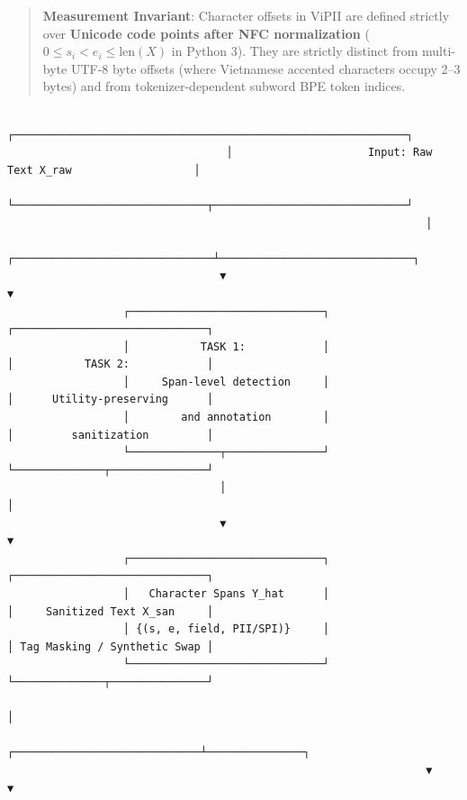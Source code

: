 \documentclass[
]{article}
\begin{document}
\begin{quote}
\textbf{Measurement Invariant}: Character offsets in ViPII are defined
strictly over \textbf{Unicode code points after NFC normalization}
(\(0 \le s_i < e_i \le \text{len}(X)\) in Python 3). They are strictly
distinct from multi-byte UTF-8 byte offsets (where Vietnamese accented
characters occupy 2--3 bytes) and from tokenizer-dependent subword BPE
token indices.
\end{quote}

\begin{verbatim}
                                  ┌─────────────────────────────────────────────────────────────┐
                                  │                     Input: Raw Text X_raw                   │
                                  └──────────────────────────────┬──────────────────────────────┘
                                                                 │
                                 ┌───────────────────────────────┴──────────────────────────────┐
                                 ▼                                                              ▼
                  ┌──────────────────────────────┐                              ┌──────────────────────────────┐
                  │           TASK 1:            │                              │           TASK 2:            │
                  │     Span-level detection     │                              │      Utility-preserving      │
                  │        and annotation        │                              │         sanitization         │
                  └──────────────┬───────────────┘                              └──────────────┬───────────────┘
                                 │                                                             │
                                 ▼                                                             ▼
                  ┌──────────────────────────────┐                              ┌──────────────────────────────┐
                  │   Character Spans Y_hat      │                              │     Sanitized Text X_san     │
                  │ {(s, e, field, PII/SPI)}     │                              │ Tag Masking / Synthetic Swap │
                  └──────────────────────────────┘                              └──────────────┬───────────────┘
                                                                                               │
                                                                 ┌─────────────────────────────┴───────────────┐
                                                                 ▼                                             ▼

\end{verbatim}
\end{document}
